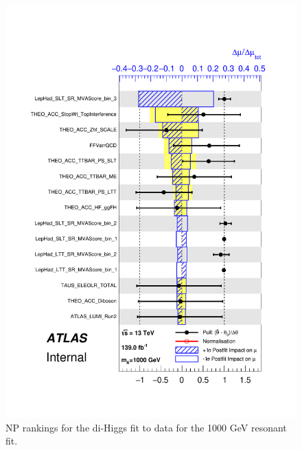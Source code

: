 \begin{figure}
\centering
\includegraphics[width=.8\textwidth]{figures/results/HH/LepHad/pulls_SigXsecOverSM_1000.pdf}
\caption{NP rankings for the di-Higgs \lephad fit to data for the 1000 GeV resonant fit.}
\label{fig:LepHadPostfitNPRankings2HDM1000}
\end{figure}

